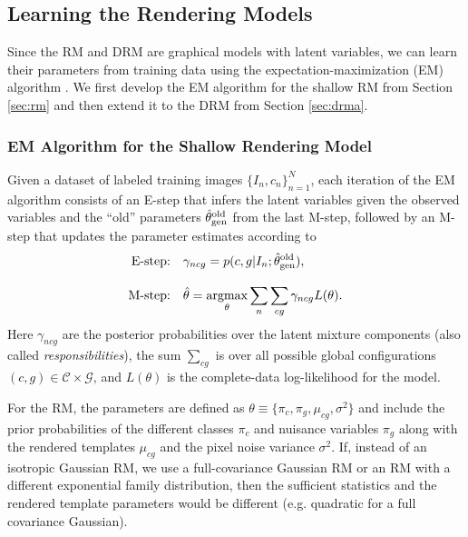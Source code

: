 \documentclass[12pt]{article}
\DeclareMathOperator*{\argmax}{argmax}
\newcommand{\Cl}[0]{{ \mathcal{C} }}
\newcommand{\G}[0]{{ \mathcal{G} }}
\begin{document}
\subsection{Learning the Rendering Models}

Since the RM and DRM are graphical models with latent variables, we can learn their parameters from training data using the expectation-maximization (EM) algorithm \cite{roweis2001learning}. 
We first develop the EM algorithm for the shallow RM from Section \ref{sec:rm} and then extend it to the DRM from Section \ref{sec:drma}.

\subsubsection{EM Algorithm for the Shallow Rendering Model}

Given a dataset of labeled training images $\{ I_n, c_n \}_{n=1}^N$, each iteration of the EM algorithm consists of an E-step that infers the latent variables given the observed variables and the ``old'' parameters $\hat{\theta}_{\rm gen}^{\rm old}$ from the last M-step, followed by an M-step that updates the parameter estimates according to
\begin{align}
\textrm{E-step:}& \quad 
\gamma_{ncg} = p(c, g | I_n; \hat{\theta}_{\rm gen}^{\rm old}), 
\label{eqn:ShallowEStep}
\\[3mm]
\textrm{M-step:}& \quad 
\hat{\theta} = \argmax_{\theta} \sum_n \sum_{cg} \gamma_{ncg} L(\theta).
\label{eqn:EMGeneral}
\end{align}
Here $\gamma_{ncg}$ are the posterior probabilities over the latent mixture components (also called \the \emph{responsibilities}), the sum $\sum_{cg}$ is over all possible global configurations $(c, g) \in \Cl \times \G$, and $L(\theta)$ is the complete-data log-likelihood for the model.

For the RM, the parameters are defined as $\theta \equiv \{ \pi_{c}, \pi_{g}, \mu_{cg}, \sigma^{2}  \}$ and include the prior probabilities of the different classes $\pi_c$ and nuisance variables $\pi_g$ along with the rendered templates $\mu_{cg}$ and the pixel noise variance $\sigma^2$. If, instead of an isotropic Gaussian RM, we use a full-covariance Gaussian RM or an RM with a different exponential family distribution, then the sufficient statistics and the rendered template parameters would be different (e.g. quadratic for a full covariance Gaussian).
\end{document}
